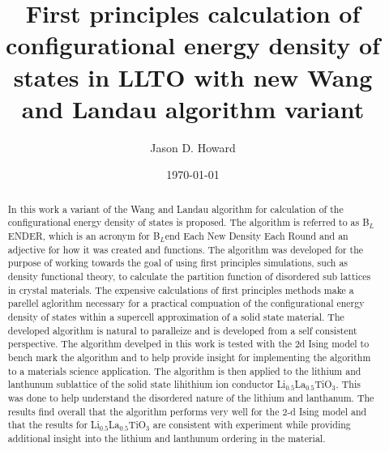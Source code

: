 \documentclass[aps,prl,reprint,superscriptaddress,showkeys]{revtex4-1}
\begin{document}
\title{First principles calculation of configurational energy density of states in LLTO with new Wang and Landau algorithm variant }

\author{Jason D. Howard}

\date{\today}

%


\begin{acknowledgments}
\end{acknowledgments}
\begin{abstract}
In this work  a variant of the Wang and Landau algorithm   for calculation of  the configurational energy density of states is proposed. The algorithm is referred to as B$_L$ENDER, which is an acronym for B$_L$end Each New Density Each Round and an  adjective for  how it was created and functions. The algorithm was developed for the purpose of working towards the goal of using first principles simulations, such as density functional theory, to calculate the partition function of disordered sub lattices in crystal materials. The expensive calculations of first principles methods make a parellel aglorithm necessary for a practical compuation of the configurational energy density of states within a supercell approximation of a solid state material. The developed algorithm is natural to paralleize and is developed from a self consistent perspective.  The algorithm develped in this work is tested with the 2d Ising model to bench mark the algorithm and to help provide insight for implementing the algorithm to a materials science application. The algorithm is then applied to the lithium and lanthunum sublattice of the solid state lihithium ion conductor Li$_{0.5}$La$_{0.5}$TiO$_{3}$. This was done to help understand the disordered nature of the lithium and lanthanum. The results find overall that the algorithm performs very well for the 2-d Ising model and that the results for Li$_{0.5}$La$_{0.5}$TiO$_{3}$ are consistent with experiment while providing additional insight into the lithium and lanthunum ordering in the material. 
\end{abstract}
\maketitle
\end{document}
